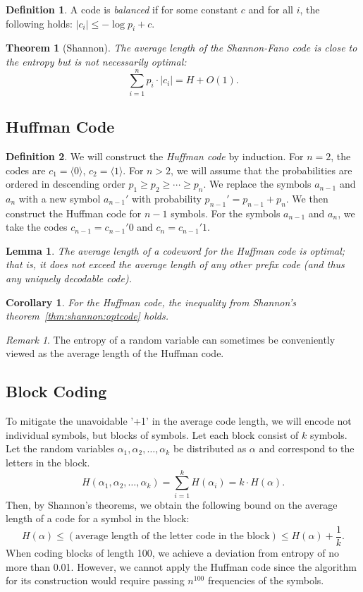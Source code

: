 \documentclass[12pt,sans]{article}
\newcommand{\seqn}[2]{{#1}_1,{#1}_2,\dotsc,{#1}_{#2}}
\theoremstyle{definition}
\newtheorem{definition}{Definition}[section]
\theoremstyle{plain}
\newtheorem{theorem}{Theorem}[section]
\newtheorem{lemma}{Lemma}[section]
\newtheorem{corollary}{Corollary}[section]
\theoremstyle{remark}
\newtheorem{remark}{Remark}[section]
\begin{document}
\begin{definition}
    A code is \emph{balanced} if for some constant \(c\) and for
    all \(i\), the following holds: \(|c_i| \le - \log p_i + c\).
\end{definition}

\begin{theorem}[Shannon]
    The average length of the Shannon-Fano code is close to the entropy but is not necessarily
    optimal:
    \[
    \sum_{i=1}^n p_i \cdot |c_i| = H + O(1).
    \]
\end{theorem}
\subsection{Huffman Code}
\begin{definition}
    We will construct the \emph{Huffman code} by induction. For \(n = 2\), the codes are \(c_1 = \langle0\rangle\), \(c_2 = \langle1\rangle\). For \(n > 2\), we will assume that the probabilities are ordered in descending order \(p_1 \ge p_2 \ge \dotsb \ge p_n\). We replace the symbols \(a_{n-1}\) and \(a_n\) with a new symbol \(a_{n-1}'\) with probability \(p_{n-1}' = p_{n-1} + p_n\). We then construct the Huffman code for \(n-1\) symbols. For the symbols \(a_{n-1}\) and \(a_n\), we take the codes \(c_{n-1} = c_{n-1}'0\) and \(c_{n} = c_{n-1}'1\).
\end{definition}

\begin{lemma}
    The average length of a codeword for the Huffman code is optimal; that is, it does not exceed the average length of any other prefix code (and thus any uniquely decodable code).
\end{lemma}

\begin{corollary}
    For the Huffman code, the inequality from Shannon's theorem~\ref{thm:shannon:optcode} holds.
\end{corollary}

\begin{remark}
    The entropy of a random variable can sometimes be conveniently viewed as the average length of the Huffman code.
\end{remark}

\subsection{Block Coding}
To mitigate the unavoidable '+1' in the average code length, we will encode not individual symbols, but blocks of symbols.
Let each block consist of \(k\) symbols. Let the random variables \(\seqn{\alpha}{k}\) be distributed as \(\alpha\) and correspond to the letters in the block.
\[
H(\seqn{\alpha}{k}) = \sum_{i=1}^k H(\alpha_i) = k \cdot H(\alpha).
\]
Then, by Shannon's theorems, we obtain the following bound on the average length of a code for a symbol in the block:
\[
H(\alpha) \le (\text{average length of the letter code in the block}) \le H(\alpha) +
\frac{1}{k}.
\]
When coding blocks of length 100, we achieve a deviation from entropy of no more than 0.01. However, we cannot apply the Huffman code since the algorithm for its construction would require passing \(n^{100}\) frequencies of the symbols.
\end{document}
